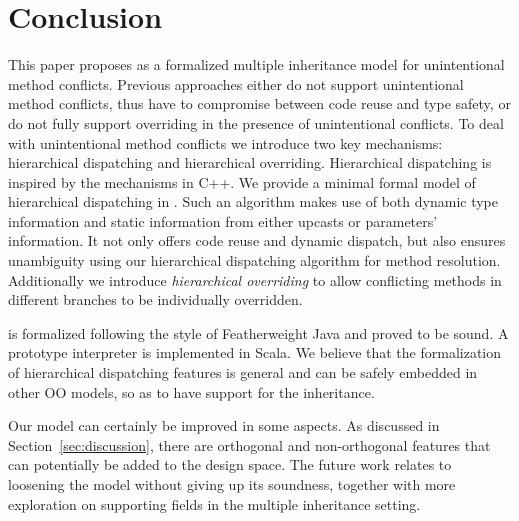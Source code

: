 \section{Conclusion}


This paper proposes \MIM{} as a formalized multiple inheritance model for
unintentional method conflicts. Previous approaches 
either do not support unintentional method conflicts, thus have to
compromise between code reuse and type safety, or do not fully support
overriding in the presence of unintentional conflicts. To deal with unintentional method conflicts we
introduce two key mechanisms: hierarchical dispatching and
hierarchical overriding. Hierarchical dispatching is inspired by the
mechanisms in C++. We provide a minimal formal model of hierarchical
dispatching in \MIM{}. Such an algorithm makes use of both dynamic type
information and static information from either upcasts or parameters'
information. It not only offers code reuse and
dynamic dispatch, but also ensures unambiguity using our hierarchical
dispatching algorithm for
method resolution. Additionally we introduce \emph{hierarchical
  overriding} to allow conflicting methods in different branches to be
individually overridden.

\MIM{} is formalized following the style of
Featherweight Java and proved to be sound. A prototype interpreter is
implemented in Scala. We believe that the formalization of
hierarchical dispatching features is general and
can be safely embedded in other OO models, so as to have support for the \wordfork{}
inheritance.

Our model can certainly be improved in some aspects. 
As discussed in Section~\ref{sec:discussion}, there are orthogonal and
non-orthogonal features that can potentially be added to the design space. 
The future work relates to loosening the model without giving up its soundness,
together with more exploration on supporting fields in the multiple inheritance setting.
